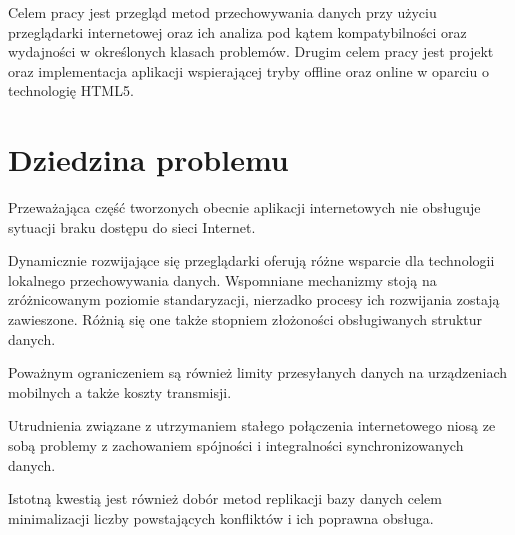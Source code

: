 Celem pracy jest przegląd metod przechowywania danych przy użyciu przeglądarki internetowej oraz ich analiza pod kątem kompatybilności oraz wydajności w określonych klasach problemów. Drugim celem pracy jest projekt oraz implementacja aplikacji wspierającej tryby offline oraz online w oparciu o technologię HTML5\cite{html5}.

\section{Dziedzina problemu}
\label{sec:dziedzinaProblemu}

Przeważająca część tworzonych obecnie aplikacji internetowych nie obsługuje sytuacji braku dostępu do sieci Internet. 

Dynamicznie rozwijające się przeglądarki oferują różne wsparcie dla technologii lokalnego przechowywania danych. Wspomniane mechanizmy stoją na zróżnicowanym poziomie standaryzacji, nierzadko procesy ich rozwijania zostają zawieszone. Różnią się one także stopniem złożoności obsługiwanych struktur danych.

Poważnym ograniczeniem są również limity przesyłanych danych na urządzeniach mobilnych a także koszty transmisji.

Utrudnienia związane z utrzymaniem stałego połączenia internetowego niosą ze sobą problemy z zachowaniem spójności i integralności synchronizowanych danych.

Istotną kwestią jest również dobór metod replikacji bazy danych celem minimalizacji liczby powstających konfliktów i ich poprawna obsługa.
